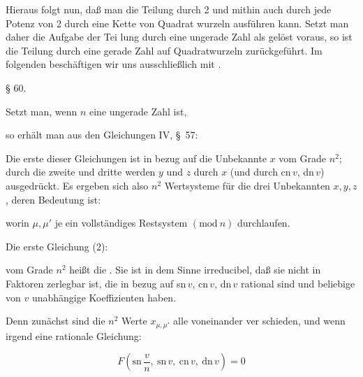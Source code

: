 
Hieraus folgt nun, daß man die Teilung durch 2 und mithin
auch durch jede Potenz von 2 durch eine Kette von Quadrat\-
wurzeln ausführen kann. Setzt man daher die Aufgabe der Tei\-
lung durch eine ungerade Zahl als gelöst voraus, so ist die
Teilung durch eine gerade Zahl auf Quadratwurzeln zurückgeführt. Im
folgenden beschäftigen wir uns ausschließlich mit .

\begin{center}
§ 60. 
\end{center}

Setzt man, wenn $n$ eine ungerade Zahl ist,


so erhält man aus den Gleichungen IV, \S\ 57:


Die erste dieser Gleichungen ist in bezug auf die Unbekannte
$x$ vom Grade $n^2$; durch die zweite und dritte werden $y$ und $z$
 durch $x$ (und durch cn\,$v$, dn\,$v$) ausgedrückt. Es ergeben
sich also $n^2$ Wertsysteme für die drei Unbekannten $x, y, z$, deren
Bedeutung ist:


worin $\mu, \mu'$ je ein vollständiges Restsystem $(\mathrm{mod}\ n)$
durchlaufen.

Die erste Gleichung (2):


vom Grade $n^2$ heißt die . Sie
ist in dem Sinne irreducibel, daß sie nicht in Faktoren zerlegbar
ist, die in bezug auf sn\,$v$, cn\,$v$, dn\,$v$ rational sind und beliebige
von $v$ unabhängige Koeffizienten haben.

Denn zunächst sind die $n^2$ Werte $x_{\mu,\mu'}$ alle voneinander ver\-
schieden, und wenn irgend eine rationale Gleichung:

\[
F\left(\mathrm{sn}\,\frac{v}{n},\ \mathrm{sn}\,v,\ \mathrm{cn}\,v,\ \mathrm{dn}\,v\right) = 0
\]
